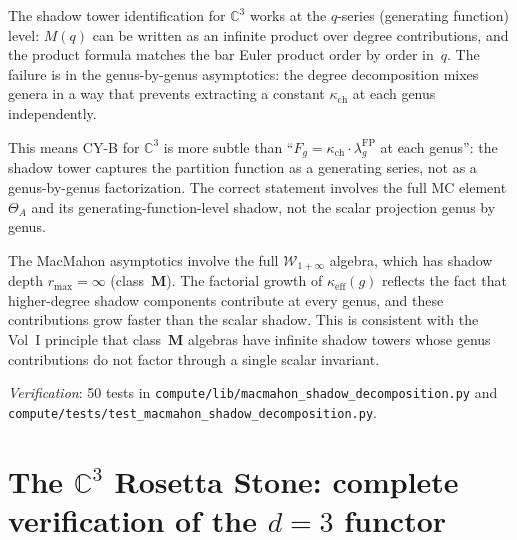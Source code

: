 \documentclass[11pt]{article}
\newcommand{\cW}{\mathcal{W}}
\newcommand{\C}{\mathbb{C}}
\begin{document}
\begin{remark}
\label{rem:macmahon-degree}
The shadow tower identification for $\C^3$ works at the
$q$-series (generating function) level: $M(q)$ can be written as an
infinite product over degree contributions, and the product formula
matches the bar Euler product order by order in~$q$.
The failure is in the genus-by-genus asymptotics: the degree
decomposition mixes genera in a way that prevents extracting
a constant $\kappa_{\mathrm{ch}}$ at each genus independently.

This means CY-B for $\C^3$ is more subtle than
``$F_g = \kappa_{\mathrm{ch}} \cdot \lambda_g^{\mathrm{FP}}$
at each genus'': the shadow tower captures the partition function
as a generating series, not as a genus-by-genus
factorization. The correct statement involves the full
MC element $\Theta_A$ and its generating-function-level
shadow, not the scalar projection genus by genus.
\end{remark}

\begin{remark}
The MacMahon asymptotics involve the full
$\cW_{1+\infty}$ algebra, which has shadow depth
$r_{\max} = \infty$ (class~$\mathbf{M}$).
The factorial growth of $\kappa_{\mathrm{eff}}(g)$ reflects
the fact that higher-degree shadow components contribute
at every genus, and these contributions grow
faster than the scalar shadow. This is consistent with
the Vol~I principle that class~$\mathbf{M}$ algebras
have infinite shadow towers whose genus contributions
do not factor through a single scalar invariant.
\end{remark}

\noindent\textit{Verification}: 50 tests in
\texttt{compute/lib/macmahon\_shadow\_decomposition.py}
and \texttt{compute/tests/test\_macmahon\_shadow\_decomposition.py}.

%
%
%


\section{The $\C^3$ Rosetta Stone: complete verification of the $d=3$ functor}
\label{sec:c3-rosetta}
\end{document}
